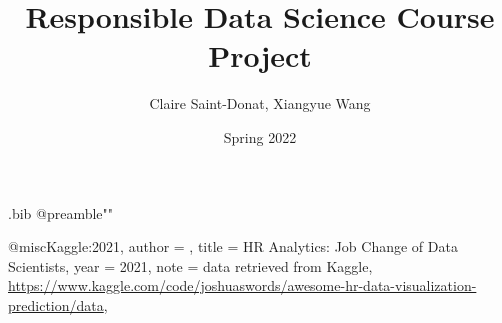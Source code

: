 
\begin{filecontents*}{\jobname.bib}
@preamble{"\DeclareRobustCommand{\firstsecond}[2]{#2}"}

@misc{Kaggle:2021,
  author = {{}},
  title = {HR Analytics: Job Change of Data Scientists},
  year = {2021},
  note = {data retrieved from Kaggle, 
          \url{https://www.kaggle.com/code/joshuaswords/awesome-hr-data-visualization-prediction/data}},
}
\end{filecontents*}



\documentclass[11pt]{article}
\usepackage[top=3cm, bottom=3cm, left = 2cm, right = 2cm]{geometry}  
\usepackage[utf8]{inputenc}
\usepackage{textcomp}
\usepackage{graphicx} 
\graphicspath{ {images/} }
\usepackage{wrapfig}
\usepackage{amsmath,amssymb}  
\usepackage{bm}  
\usepackage[pdftex,bookmarks,colorlinks,breaklinks]{hyperref}  
\hypersetup{linkcolor=black,citecolor=black,filecolor=black,urlcolor=blue} %
\usepackage{memhfixc} 
\usepackage{pdfsync}  
\usepackage{fancyhdr}
\usepackage{indentfirst}
\usepackage[affil-it]{authblk}
\usepackage{float}

\DeclareRobustCommand{\firstsecond}[2]{#1}

\renewcommand\Affilfont{\fontsize{9}{10.8}\itshape}
\pagestyle{fancy}

\title{Responsible Data Science Course Project}
\author{Claire Saint-Donat, Xiangyue Wang}
\date{Spring 2022}


\maketitle
\tableofcontents

\section{Introduction}

The purpose of this project is to build an interpretability tool for an Automated Decision System (ADS) which we have chosen to audit.

Automated Decision Systems are in widespread use in government and industry, and a number of efforts are currently underway to regulate them.  New York City recently passed a law (Local Law 49 of 2018) that compels the development of procedures and recommendations that City agencies should follow when explaining the operation of an ADS to the public, and demonstrating that an ADS does not discriminate against individuals based on membership in protected groups.  

